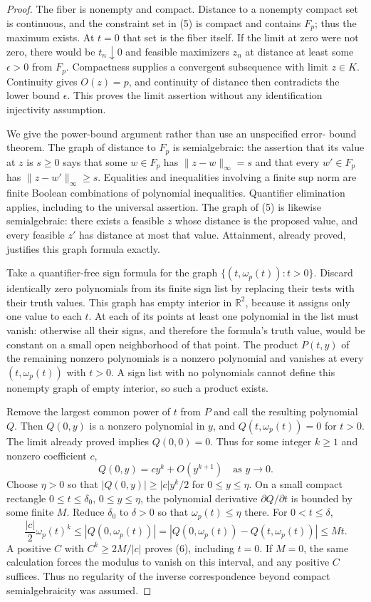 \documentclass[11pt]{article}
\theoremstyle{remark}\newtheorem{remark}[theorem]{Remark}
\begin{document}
\begin{proof}
The fiber is nonempty and compact. Distance to a nonempty compact set is
continuous, and the constraint set in (5) is compact and contains $F_p$;
thus the maximum exists. At $t=0$ that set is the fiber itself. If the
limit at zero were not zero, there would be $t_n\downarrow0$ and feasible
maximizers $z_n$ at distance at least some $\epsilon>0$ from $F_p$.
Compactness supplies a convergent subsequence with limit $z\in K$.
Continuity gives $O(z)=p$, and continuity of distance then contradicts the
lower bound $\epsilon$. This proves the limit assertion without any
identification injectivity assumption.

We give the power-bound argument rather than use an unspecified error-
bound theorem. The graph of distance to $F_p$ is semialgebraic: the
assertion that its value at $z$ is $s\geq0$ says that some $w\in F_p$
has $\|z-w\|_\infty=s$ and that every $w'\in F_p$ has
$\|z-w'\|_\infty\geq s$. Equalities and inequalities involving a finite
sup norm are finite Boolean combinations of polynomial inequalities.
Quantifier elimination applies, including to the universal assertion.
The graph of (5) is likewise semialgebraic: there exists a feasible $z$
whose distance is the proposed value, and every feasible $z'$ has distance
at most that value. Attainment, already proved, justifies this graph
formula exactly.

Take a quantifier-free sign formula for the graph
$\{(t,\omega_p(t)):t>0\}$. Discard identically zero polynomials from its
finite sign list by replacing their tests with their truth values. This
graph has empty interior in $\mathbb R^2$, because it assigns only one
value to each $t$. At each of its points at least one polynomial in the
list must vanish: otherwise all their signs, and therefore the formula's
truth value, would be constant on a small open neighborhood of that point.
The product $P(t,y)$ of the remaining nonzero polynomials is a nonzero
polynomial and vanishes at every $(t,\omega_p(t))$ with $t>0$.
A sign list with no polynomials cannot define this nonempty graph of empty
interior, so such a product exists.

Remove the largest common power of $t$ from $P$ and call the resulting
polynomial $Q$. Then $Q(0,y)$ is a nonzero polynomial in $y$, and
$Q(t,\omega_p(t))=0$ for $t>0$. The limit already proved implies
$Q(0,0)=0$. Thus for some integer $k\geq1$ and nonzero coefficient $c$,
\[
 Q(0,y)=c y^k+O(y^{k+1})\quad\text{as }y\to0.
\]
Choose $\eta>0$ so that $|Q(0,y)|\geq |c|y^k/2$ for
$0\leq y\leq\eta$. On a small compact rectangle
$0\leq t\leq\delta_0$, $0\leq y\leq\eta$, the polynomial derivative
$\partial Q/\partial t$ is bounded by some finite $M$. Reduce
$\delta_0$ to $\delta>0$ so that $\omega_p(t)\leq\eta$ there. For
$0<t\leq\delta$,
\[
 \frac{|c|}{2}\omega_p(t)^k
 \leq|Q(0,\omega_p(t))|
 =|Q(0,\omega_p(t))-Q(t,\omega_p(t))|
 \leq Mt.
\]
A positive $C$ with $C^k\geq2M/|c|$ proves (6), including $t=0$.
If $M=0$, the same calculation forces the modulus to vanish on this
interval, and any positive $C$ suffices. Thus no regularity of the
inverse correspondence beyond compact semialgebraicity was assumed.


\end{proof}
\end{document}

